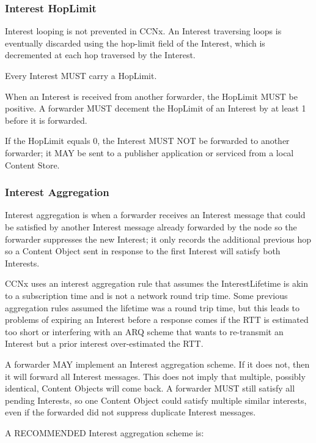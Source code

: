 \documentclass[12pt]{report}
\begin{document}
\subsubsection{Interest HopLimit}
Interest looping is not prevented in CCNx.  An Interest traversing
loops is eventually discarded using the hop-limit field of the
Interest, which is decremented at each hop traversed by the Interest.

Every Interest MUST carry a HopLimit.

When an Interest is received from another forwarder, the HopLimit
MUST be positive.  A forwarder MUST decement the HopLimit of an
Interest by at least 1 before it is forwarded.

If the HopLimit equals 0, the Interest MUST NOT be forwarded to
another forwarder; it MAY be sent to a publisher application or
serviced from a local Content Store.

\subsubsection{Interest Aggregation}
Interest aggregation is when a forwarder receives an Interest message
that could be satisfied by another Interest message already forwarded
by the node so the forwarder suppresses the new Interest; it only
records the additional previous hop so a Content Object sent in
response to the first Interest will satisfy both Interests.

CCNx uses an interest aggregation rule that assumes the
InterestLifetime is akin to a subscription time and is not a network
round trip time.  Some previous aggregation rules assumed the
lifetime was a round trip time, but this leads to problems of
expiring an Interest before a response comes if the RTT is estimated
too short or interfering with an ARQ scheme that wants to re-transmit
an Interest but a prior interest over-estimated the RTT.

A forwarder MAY implement an Interest aggregation scheme.  If it does
not, then it will forward all Interest messages.  This does not imply
that multiple, possibly identical, Content Objects will come back.  A
forwarder MUST still satisfy all pending Interests, so one Content
Object could satisfy multiple similar interests, even if the
forwarded did not suppress duplicate Interest messages.

A RECOMMENDED Interest aggregation scheme is:
\end{document}
